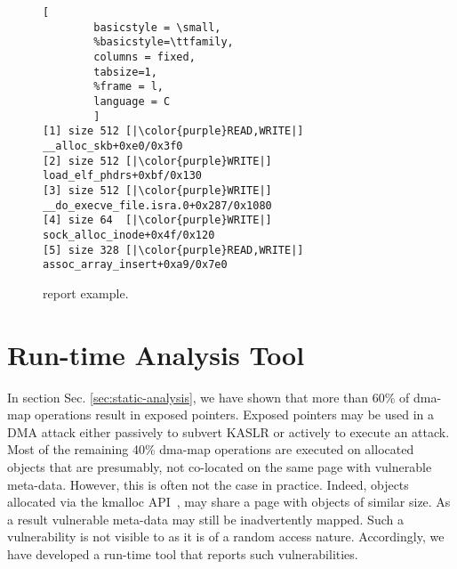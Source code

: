 \begin{figure}[t]
\begin{adjustbox}{width=\linewidth}
        \begin{lstlisting}[
        basicstyle = \small,
        %basicstyle=\ttfamily,
        columns = fixed,
        tabsize=1,
        %frame = l,
        language = C
        ]
[1] size 512 [|\color{purple}READ,WRITE|] __alloc_skb+0xe0/0x3f0
[2] size 512 [|\color{purple}WRITE|] load_elf_phdrs+0xbf/0x130
[3] size 512 [|\color{purple}WRITE|] __do_execve_file.isra.0+0x287/0x1080
[4] size 64  [|\color{purple}WRITE|] sock_alloc_inode+0x4f/0x120
[5] size 328 [|\color{purple}READ,WRITE|] assoc_array_insert+0xa9/0x7e0
        \end{lstlisting}
\end{adjustbox}
        \caption{\dkasan report example.}
        \label{fig:dkasan-report}
\end{figure}


\section{Run-time Analysis Tool}\label{sec:dma-kasan} 

In section Sec. \ref{sec:static-analysis}, we have shown that more than 60\% of dma-map operations result in exposed pointers. Exposed pointers may be used in a DMA attack either passively to subvert KASLR or actively to execute an attack. Most of the remaining 40\% dma-map operations are executed on allocated objects that are presumably, not co-located on the same page with vulnerable meta-data. However, this is often not the case in practice.
Indeed, objects allocated via the kmalloc API~\cite{Cor07}, may share a page with objects of similar size. As a result vulnerable meta-data may still be inadvertently mapped. 
%
Such a vulnerability is not visible to \tool as it is of a random access nature. Accordingly, we have developed a run-time tool that reports such vulnerabilities. 


